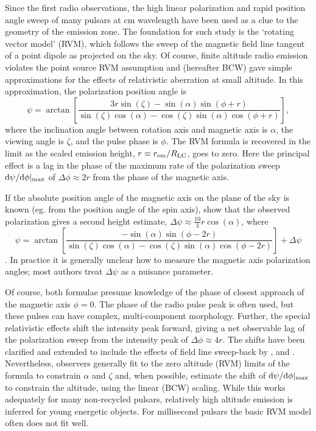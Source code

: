 	Since the first radio observations, the high linear polarization and rapid
position angle sweep of many pulsars at cm wavelength have been used as a clue to
the geometry of the emission zone. The foundation for such study is the 
\cite{radhakrishnan1969magnetic} `rotating vector model' (RVM), which follows the sweep
of the magnetic field line tangent of a point dipole as projected on the sky.
Of course, finite altitude radio emission violates the point source RVM assumption and
\cite{blaskiewicz1991relativistic} (hereafter BCW) gave simple approximations for the effects of
relativistic aberration at small altitude. In this approximation, the polarization
position angle is
\begin{equation}\label{eq:BCW}
\psi=\arctan\left[\frac{3 r \sin(\zeta) - \sin(\alpha) \sin(\phi+r)}
{\sin(\zeta) \cos(\alpha) -\cos(\zeta) \sin(\alpha) \cos(\phi+r)}\right],
\end{equation}
where the inclination angle between rotation axis and magnetic axis is $\alpha$, the viewing angle is 
$\zeta$, and the pulse phase is $\phi$.
The RVM formula is recovered in the limit as the scaled emission height, 
$r\equiv r_{\rm{em}}/R_{\rm{LC}}$, goes to zero.  
Here the principal effect is
a lag in the phase of the maximum rate of the polarization sweep ${\rm d}\psi/{\rm d}\phi|_{\rm{max}}$
of $\Delta\phi \approx 2r$ from the phase of the magnetic axis. 

	If the absolute position angle of the magnetic axis on the plane of the
sky is known (eg. from the position angle of the spin axis), \cite{hibschman2001polarization}
show that the observed polarization gives a second height estimate,
$\Delta\psi \approx \frac{10}{3} r\cos(\alpha)$, where
\begin{equation}\label{eq:BCWPhi}
\psi=\arctan\left[\frac{-\sin(\alpha)\sin(\phi-2r)}
{\sin(\zeta) \cos(\alpha) -\cos(\zeta) \sin(\alpha) \cos(\phi-2r)}\right]+\Delta\psi
\end{equation}
\citep{dyks2008altitude}. In practice it is generally
unclear how to measure the magnetic axis polarization angles; most authors treat $\Delta\psi$ 
as a nuisance parameter.

	Of course, both formulae presume knowledge of the phase of closest approach 
of the magnetic axis $\phi=0$. The phase of the radio pulse peak is often used, 
but these pulses can have complex, multi-component morphology.  Further, the 
special relativistic effects shift the intensity peak forward, giving a net 
observable lag of the polarization sweep from the intensity peak 
of $\Delta \phi \approx 4r$. 
The shifts have been clarified and extended to include the effects of field 
line sweep-back by \cite{dyks2004rotational}, and \cite{dyks2008altitude}.
Nevertheless, observers generally fit to the zero altitude (RVM) limits of 
the formula to constrain $\alpha$ and $\zeta$ and, when possible,
estimate the shift of ${\rm d} \psi/{\rm d}\phi|_{\rm{max}}$ to constrain the altitude,
using the linear (BCW) scaling.  While this works adequately for many non-recycled
pulsars, relatively high altitude emission is inferred for young energetic objects. For
millisecond pulsars the basic RVM model often does not fit well.

